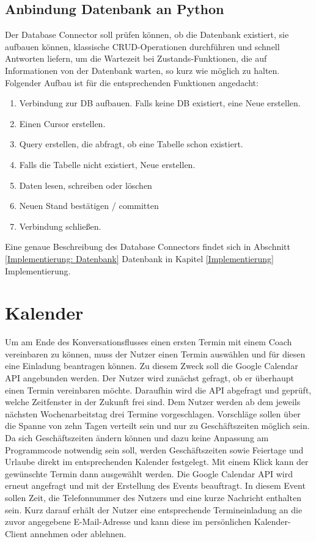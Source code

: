         \subsection{Anbindung Datenbank an Python} \label{Realisierung: data base connector}
            Der Database Connector soll prüfen können, ob die Datenbank existiert, sie aufbauen können, klassische CRUD-Operationen durchführen und schnell Antworten liefern, um die Wartezeit bei Zustands-Funktionen, die auf Informationen von der Datenbank warten, so kurz wie möglich zu halten. Folgender Aufbau ist für die entsprechenden Funktionen angedacht:
            \begin{enumerate}
                \item Verbindung zur DB aufbauen. Falls keine DB existiert, eine Neue erstellen.
                \item Einen Cursor erstellen.
                \item Query erstellen, die abfragt, ob eine Tabelle schon existiert.
                \item Falls die Tabelle nicht existiert, Neue erstellen.
                \item Daten lesen, schreiben oder löschen
                \item Neuen Stand bestätigen / committen
                \item Verbindung schließen.
            \end{enumerate}

            Eine genaue Beschreibung des Database Connectors findet sich in Abschnitt \ref*{Implementierung: Datenbank} Datenbank in Kapitel \ref*{Implementierung} Implementierung.


    \section{Kalender} \label{Realisierung: calendar}
        Um am Ende des Konversationsflusses einen ersten Termin mit einem Coach vereinbaren zu können, muss der Nutzer einen Termin auswählen und für diesen eine Einladung beantragen können. Zu diesem Zweck soll die Google Calendar API angebunden werden. Der Nutzer wird zunächst gefragt, ob er überhaupt einen Termin vereinbaren möchte. Daraufhin wird die API abgefragt und geprüft, welche Zeitfenster in der Zukunft frei sind. Dem Nutzer werden ab dem jeweils nächsten Wochenarbeitstag drei Termine vorgeschlagen. Vorschläge sollen über die Spanne von zehn Tagen verteilt sein und nur zu Geschäftszeiten möglich sein. Da sich Geschäftszeiten ändern können und dazu keine Anpassung am Programmcode notwendig sein soll, werden Geschäftszeiten sowie Feiertage und Urlaube direkt im entsprechenden Kalender festgelegt. Mit einem Klick kann der gewünschte Termin dann ausgewählt werden. Die Google Calendar API wird erneut angefragt und mit der Erstellung des Events beauftragt. In diesem Event sollen Zeit, die Telefonnummer des Nutzers und eine kurze Nachricht enthalten sein. Kurz darauf erhält der Nutzer eine entsprechende Termineinladung an die zuvor angegebene E-Mail-Adresse und kann diese im persönlichen Kalender-Client annehmen oder ablehnen.
        

